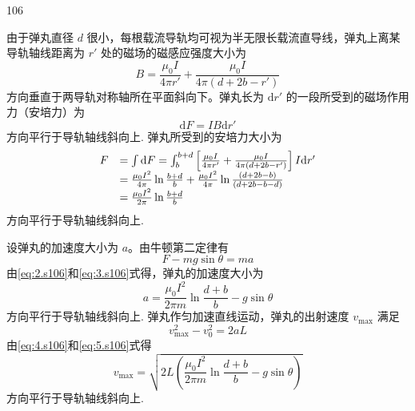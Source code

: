 \begin{solution}{106}
\begin{subsolution}
由于弹丸直径 $d$ 很小，每根载流导轨均可视为半无限长载流直导线，弹丸上离某导轨轴线距离为 $r'$ 处的磁场的磁感应强度大小为
\begin{equation}
B = \frac{\mu_{0} I}{4\pi r'} + \frac{\mu_{0} I}{4\pi (d + 2b - r')}
\label{eq:1.s106}
\end{equation}
方向垂直于两导轨对称轴所在平面斜向下。弹丸长为 $\mathrm{d}r'$ 的一段所受到的磁场作用力（安培力）为
\[
\mathrm{d}F = I B \mathrm{d}r'
\]
方向平行于导轨轴线斜向上. 弹丸所受到的安培力大小为
\begin{equation}
\begin{array}{r l}
F & = \int \mathrm{d}F = \int_{b}^{b+d} \left[ \frac{\mu_{0} I}{4\pi r'} + \frac{\mu_{0} I}{4\pi (d + 2b - r')} \right] I \mathrm{d}r' \\
& = \frac{\mu_{0} I^{2}}{4\pi} \ln\frac{b+d}{b} + \frac{\mu_{0} I^{2}}{4\pi} \ln\frac{(d+2b-b)}{(d+2b-b-d)} \\
& = \frac{\mu_{0} I^{2}}{2\pi} \ln\frac{b+d}{b}
\end{array}
\label{eq:2.s106}
\end{equation}
方向平行于导轨轴线斜向上.
\end{subsolution}

\begin{subsolution}
设弹丸的加速度大小为 $a$。由牛顿第二定律有
\begin{equation}
F - mg\sin\theta = m a
\label{eq:3.s106}
\end{equation}
由\eqref{eq:2.s106}和\eqref{eq:3.s106}式得，弹丸的加速度大小为
\begin{equation}
a = \frac{\mu_{0} I^{2}}{2\pi m}\ln\frac{d+b}{b} - g\sin\theta
\label{eq:4.s106}
\end{equation}
方向平行于导轨轴线斜向上.
弹丸作匀加速直线运动，弹丸的出射速度 $v_{\max}$ 满足
\begin{equation}
v_{\max}^{2} - v_{0}^{2} = 2 a L
\label{eq:5.s106}
\end{equation}
由\eqref{eq:4.s106}和\eqref{eq:5.s106}式得
\begin{equation}
v_{\max} = \sqrt{2L\left(\frac{\mu_{0} I^{2}}{2\pi m}\ln\frac{d+b}{b} - g\sin\theta\right)}
\label{eq:6.s106}
\end{equation}
方向平行于导轨轴线斜向上.
\end{subsolution}


\end{solution}
